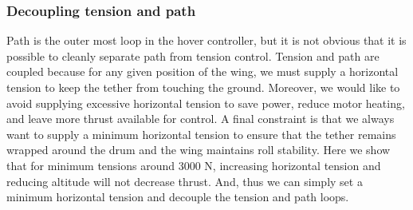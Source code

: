 \documentclass[11pt]{amsart}
\begin{document}
\begin{center}
\begin{figure}[h]
\end{figure}
\end{center}

\subsubsection{Decoupling tension and path}

Path is the outer most loop in the hover controller, but it is not
obvious that it is possible to cleanly separate path from tension
control.  Tension and path are coupled because for any given position
of the wing, we must supply a horizontal tension to keep the tether
from touching the ground.  Moreover, we would like to avoid supplying
excessive horizontal tension to save power, reduce motor heating, and
leave more thrust available for control.  A final constraint is that
we always want to supply a minimum horizontal tension to ensure that
the tether remains wrapped around the drum and the wing maintains roll
stability.  Here we show that for minimum tensions around 3000 N,
increasing horizontal tension and reducing altitude will not decrease
thrust.  And, thus we can simply set a minimum horizontal tension and
decouple the tension and path loops.
\end{document}
